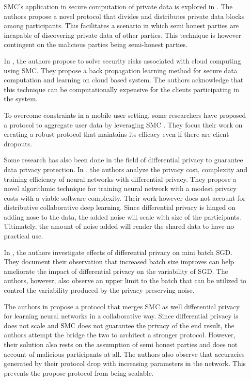\documentclass[conference]{IEEEtran}
\begin{document}
SMC's application in secure computation of private data is explored in \cite{sheikh2010distributed}. The authors propose a novel protocol that divides and distributes private data blocks among participants. This facilitates a scenario in which semi honest parties are incapable of discovering private data of other parties. This technique is however contingent on the malicious parties being semi-honest parties.

In \cite{miyajima2016new}, the authors propose to solve security risks associated with cloud computing using SMC. They propose a back propagation learning method for secure data computation and learning on cloud based system. The authors acknowledge that this technique can be computationally expensive for the clients participating in the system.

To overcome constraints in a mobile user setting, some researchers have proposed a protocol to aggregate user data by leveraging SMC \cite{bonawitz2017practical}. They focus their work on creating a robust protocol that maintains its efficacy even if there are client dropouts. 

Some research has also been done in the field of differential privacy to guarantee data privacy protection.
In \cite{abadi2016deep}, the authors analyze the privacy cost, complexity and training efficiency of neural networks with differential privacy. They propose a novel algorithmic technique for training neural network with a modest privacy costs with a viable software complexity. Their work however does not account for distributive collaborative deep learning. Since differential privacy is hinged on adding nose to the data, the added noise will scale with size of the participants. Ultimately, the amount of noise added will render the shared data to have no practical use.

In \cite {song2013stochastic}, the authors investigate effects of differential privacy on mini batch SGD. They document their observation that increased batch size improves can help ameliorate the impact of differential privacy on the variability of SGD. The authors, however, also observe an upper limit to the batch that can be utilized to control the variability produced by the privacy preserving noise.
   
The authors in \cite{chase2017private} propose a protocol that merges SMC as well differential privacy for learning neural networks in a collaborative way. Since differential privacy is does not scale and SMC does not guarantee the privacy of the end result, the authors attempt the bridge the two to architect a stronger protocol.
However, their solution also rests on the assumption of semi honest parties and does not account of malicious participants at all. The authors also observe that accuracies generated by their protocol drop with increasing parameters in the network. This prevents the propose protocol from being scalable.
\end{document}
